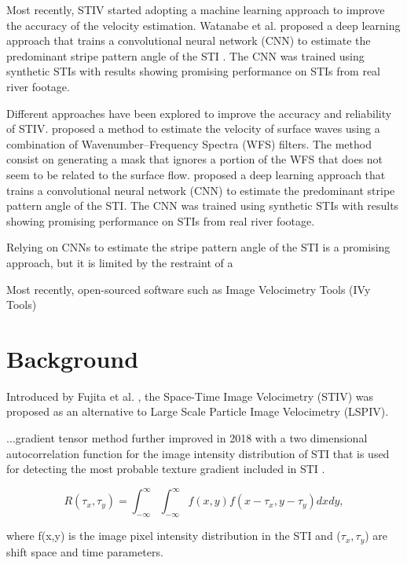 \documentclass[12pt]{elsarticle}
\begin{document}
Most recently, STIV started adopting a machine learning approach to improve the accuracy of the velocity estimation. Watanabe et al. proposed a deep learning approach that trains a convolutional neural network (CNN) to estimate the predominant stripe pattern angle of the STI \cite{watanabe2021improving}. The CNN was trained using synthetic STIs with results showing promising performance on STIs from real river footage.

Different approaches have been explored to improve the accuracy and reliability of STIV. \cite{fujita2020application} proposed a method to estimate the velocity of surface waves using a combination of Wavenumber–Frequency Spectra (WFS) filters. The method consist on generating a mask that ignores a portion of the WFS that does not seem to be related to the surface flow. \cite{watanabe2021improving} proposed a deep learning approach that trains a convolutional neural network (CNN) to estimate the predominant stripe pattern angle of the STI. The CNN was trained using synthetic STIs with results showing promising performance on STIs from real river footage.

Relying on CNNs to estimate the stripe pattern angle of the STI is a promising approach, but it is limited by the restraint of a 

Most recently, open-sourced software such as Image Velocimetry Tools (IVy Tools) \cite{engel2025ivytools}


\section{Background}
Introduced by Fujita et al. \cite{fujita2007development}, the Space-Time Image Velocimetry (STIV) was proposed as an alternative to Large Scale Particle Image Velocimetry (LSPIV).

...gradient tensor method  further improved in 2018 with a two dimensional autocorrelation function for the image intensity distribution of STI that is used for detecting the most probable texture gradient included in STI \cite{fujita2019efficient}.

\begin{equation}
    R(\tau_x, \tau_y) = \int_{-\infty}^{\infty}\int_{-\infty}^{\infty} f(x, y) f(x - \tau_x, y - \tau_y) dx dy,
\end{equation}

where f(x,y) is the image pixel intensity distribution in the STI and (\(\tau_x, \tau_y\)) are shift space and time parameters.
\end{document}
